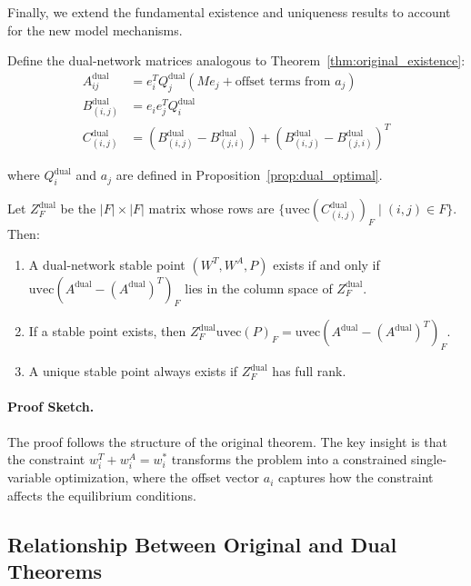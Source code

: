 Finally, we extend the fundamental existence and uniqueness results to account for the new model mechanisms.

\begin{theorem}
\label{thm:dual_existence_uniqueness}
Define the dual-network matrices analogous to Theorem~\ref{thm:original_existence}:
\begin{align}
A^{\text{dual}}_{ij} &= e_i^T Q_j^{\text{dual}} (M e_j + \text{offset terms from } a_j) \label{eq:dual_A_matrix}\\
B^{\text{dual}}_{(i,j)} &= e_i e_j^T Q_i^{\text{dual}} \label{eq:dual_B_matrix}\\
C^{\text{dual}}_{(i,j)} &= (B^{\text{dual}}_{(i,j)} - B^{\text{dual}}_{(j,i)}) + (B^{\text{dual}}_{(i,j)} - B^{\text{dual}}_{(j,i)})^T \label{eq:dual_C_matrix}
\end{align}

where $Q_i^{\text{dual}}$ and $a_j$ are defined in Proposition~\ref{prop:dual_optimal}.

Let $Z_F^{\text{dual}}$ be the $|F| \times |F|$ matrix whose rows are $\{\text{uvec}(C^{\text{dual}}_{(i,j)})_F \mid (i,j) \in F\}$. Then:

\begin{enumerate}
    \item A dual-network stable point $(W^T, W^A, P)$ exists if and only if $\text{uvec}(A^{\text{dual}} - (A^{\text{dual}})^T)_F$ lies in the column space of $Z_F^{\text{dual}}$.
    \item If a stable point exists, then $Z_F^{\text{dual}} \text{uvec}(P)_F = \text{uvec}(A^{\text{dual}} - (A^{\text{dual}})^T)_F$.
    \item A unique stable point always exists if $Z_F^{\text{dual}}$ has full rank.
\end{enumerate}
\end{theorem}

\paragraph{Proof Sketch.}
The proof follows the structure of the original theorem. The key insight is that the constraint $w_i^T + w_i^A = w_i^*$ transforms the problem into a constrained single-variable optimization, where the offset vector $a_i$ captures how the constraint affects the equilibrium conditions.


\subsection{Relationship Between Original and Dual Theorems}

